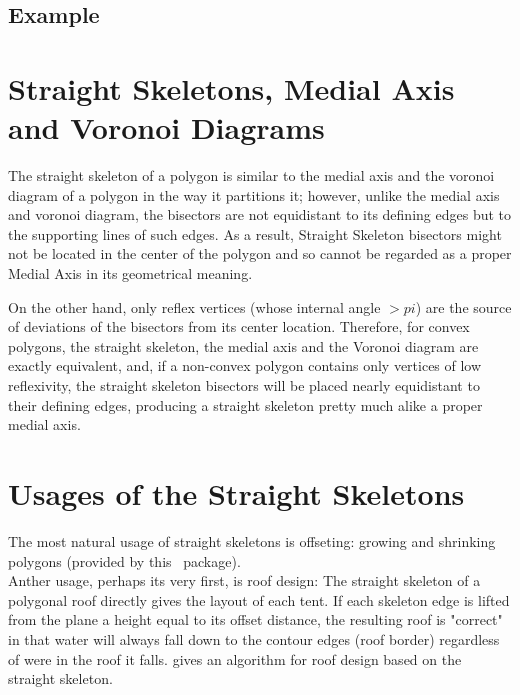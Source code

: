 \subsection{Example}



\section{Straight Skeletons, Medial Axis and Voronoi Diagrams}  

The straight skeleton of a polygon is similar to the medial
axis and the voronoi diagram of a polygon in the way it partitions
it; however, unlike the medial axis and voronoi diagram, the
bisectors are not equidistant to its defining edges but to the
supporting lines of such edges. As a result, Straight Skeleton
bisectors might not be located in the center of the polygon and so
cannot be regarded as a proper Medial Axis in its geometrical meaning.

On the other hand, only reflex vertices (whose internal angle $>pi$)
are the source of deviations of the bisectors from its center
location. Therefore, for convex polygons, the straight skeleton, the
medial axis and the Voronoi diagram are exactly equivalent,
and, if a non-convex polygon contains only vertices of low
reflexivity, the straight skeleton bisectors will be placed nearly
equidistant to their defining edges, producing a straight skeleton
pretty much alike a proper medial axis.


\section{Usages of the Straight Skeletons}  

The most natural usage of straight skeletons is offseting: growing and shrinking polygons (provided by this  \cgal\ package).\\
Anther usage, perhaps its very first, is roof design: The straight skeleton of a polygonal roof directly gives the layout of each tent. If each skeleton edge is lifted from the plane a height equal to its offset distance, the resulting roof is "correct" in that water will always fall down to the contour edges (roof border) regardless of were in the roof it falls. \cite{laycock03} gives an algorithm for roof design based on the straight skeleton.\\


